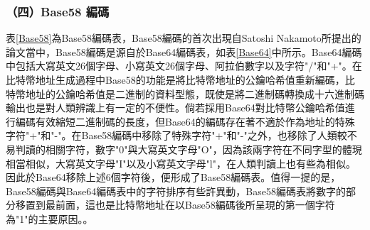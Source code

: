 				

					

				\subsubsection{（四）Base58 編碼}

				表\ref{Base58}為Base58編碼表，Base58編碼的首次出現自Satoshi Nakamoto所提出的論文\supercite{bitcoinpaper}當中，Base58編碼是源自於Base64編碼表，如表\ref{Base64}中所示。Base64編碼中包括大寫英文26個字母、小寫英文26個字母、阿拉伯數字以及字符"/"和"+"。在比特幣地址生成過程中Base58的功能是將比特幣地址的公鑰哈希值重新編碼，比特幣地址的公鑰哈希值是二進制的資料型態，既使是將二進制碼轉換成十六進制碼輸出也是對人類辨識上有一定的不便性。倘若採用Base64對比特幣公鑰哈希值進行編碼有效縮短二進制碼的長度，但Base64的編碼存在著不適於作為地址的特殊字符"+"和"-"。在Base58編碼中移除了特殊字符"+"和"-"之外，也移除了⼈類較不易判讀的相關字符，數字"0"與大寫英文字母"O"，因為該兩字符在不同字型的體現相當相似，大寫英文字母"I"以及小寫英文字母"l"，在人類判讀上也有些為相似。因此於Base64移除上述6個字符後，便形成了Base58編碼表。值得一提的是，Base58編碼與Base64編碼表中的字符排序有些許異動，Base58編碼表將數字的部分移置到最前面，這也是比特幣地址在以Base58編碼後所呈現的第一個字符為"1"的主要原因。。

